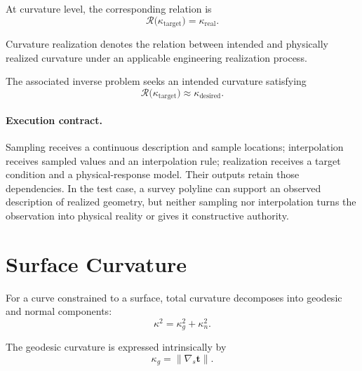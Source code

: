 At curvature level, the corresponding relation is
\begin{equation}
\mathcal R\bigl(\kappa_{\mathrm{target}}\bigr)
=
\kappa_{\mathrm{real}}.
\label{eq:curvature-realization}
\end{equation}

\begin{definition}
\label{def:curvature-realization}
Curvature realization denotes the relation between intended and
physically realized curvature under an applicable engineering
realization process.
\end{definition}

The associated inverse problem seeks an intended curvature satisfying
\begin{equation}
\mathcal R\bigl(\kappa_{\mathrm{target}}\bigr)
\approx
\kappa_{\mathrm{desired}}.
\label{eq:inverse-realization}
\end{equation}

\paragraph{Execution contract.}
Sampling receives a continuous description and sample locations;
interpolation receives sampled values and an interpolation rule;
realization receives a target condition and a physical-response model.
Their outputs retain those dependencies. In the test case, a survey
polyline can support an observed description of realized geometry, but
neither sampling nor interpolation turns the observation into physical
reality or gives it constructive authority.

\section{Surface Curvature}

For a curve constrained to a surface, total curvature decomposes into
geodesic and normal components:
\begin{equation}
\kappa^2=\kappa_g^2+\kappa_n^2.
\label{eq:curvature-decomposition}
\end{equation}

The geodesic curvature is expressed intrinsically by
\begin{equation}
\kappa_g
=
\left\|\nabla_s\mathbf t\right\|.
\label{eq:geodesic-curvature}
\end{equation}

